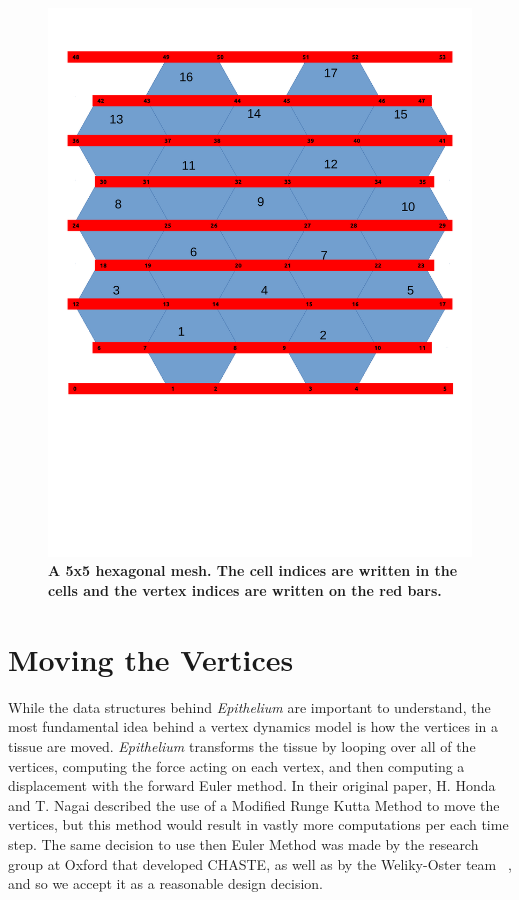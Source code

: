\begin{figure}
\centering
\includegraphics[height=0.7\textheight]{../diagrams/vert_mesh.pdf}
\caption[A 5x5 Hexagonal Mesh.]{\textbf{A 5x5 hexagonal mesh. The cell 
indices are written in the cells and the vertex indices are written on the red bars.}}
\label{fig:mesh}
\end{figure}
\section{Moving the Vertices}
While the data structures behind \emph{Epithelium} are important to understand, the most fundamental idea behind a vertex dynamics model is how the vertices in a tissue are moved.  \emph{Epithelium} transforms the tissue by looping over all of the vertices, computing the force acting on each vertex, and then computing a displacement with the forward Euler method. In their original paper, H. Honda and T. Nagai described the use of a Modified Runge Kutta Method\cite{HondaNagai} to move the vertices, but this method would result in vastly more computations per each time step. The same decision to use then Euler Method was made by the research group at Oxford that developed CHASTE, as well as by the Weliky-Oster team ~\cite{WO}, and so we accept it as a reasonable design decision. 

